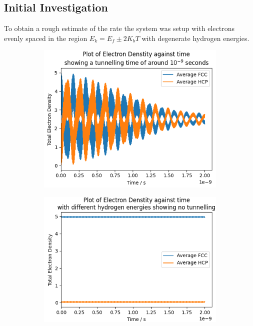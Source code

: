 \subsection{Initial Investigation}
To obtain a rough estimate of
the rate the system was setup
with electrons evenly spaced
in the region \(E_k = E_f \pm 2K_b T\)
with degenerate hydrogen energies.

\begin{figure}[htb]
    \centering
    \begin{subfigure}{0.45\linewidth}
        \includegraphics[width=0.9\linewidth]{Figures/Simulation/Plot of large band simulation decay times.png}
        \label{fig:large band degenerate simulation}
    \end{subfigure}
    \begin{subfigure}{0.45\linewidth}
        \includegraphics[width=0.9\linewidth]{Figures/Simulation/Plot of large band simulation with hydrogen energies.png}

\end{subfigure}
\end{figure}
